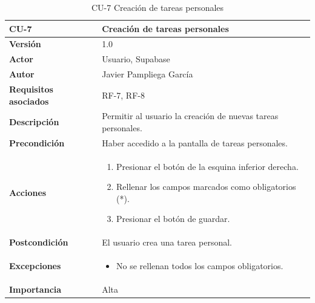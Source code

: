 \begin{table}[p]
	\centering
	\begin{tabularx}{\linewidth}{ p{} p{} }
		\toprule
		\textbf{CU-7}    & \textbf{Creación de tareas personales}\\
		\toprule
		\textbf{Versión}              & 1.0    \\
            \textbf{Actor}                & Usuario, Supabase \\
		\textbf{Autor}                & Javier Pampliega García \\
		\textbf{Requisitos asociados} & RF-7, RF-8\\
		\textbf{Descripción}          & Permitir al usuario la creación de nuevas tareas personales. \\
		\textbf{Precondición}         & Haber accedido a la pantalla de tareas personales. \\
		\textbf{Acciones}             &
		\begin{enumerate}
			\def\labelenumi{\arabic{enumi}.}
			\tightlist
			\item Presionar el botón de la esquina inferior derecha.
                \item Rellenar los campos marcados como obligatorios (*).
                \item Presionar el botón de guardar.
		\end{enumerate}\\
		\textbf{Postcondición}        & El usuario crea una tarea personal. \\
		\textbf{Excepciones}          & \begin{itemize}
		    \item No se rellenan todos los campos obligatorios.
		\end{itemize} \\
		\textbf{Importancia}          & Alta \\
		\bottomrule
	\end{tabularx}
	\caption{CU-7 Creación de tareas personales}
\end{table}

